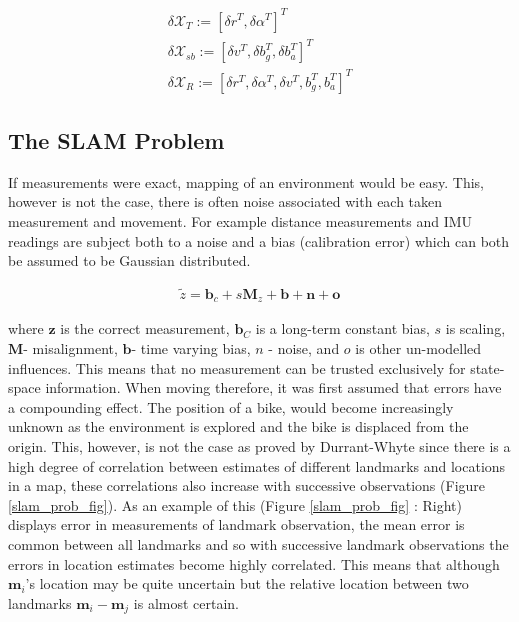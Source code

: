 \documentclass[a4paper,11pt,notitlepage]{article}
\begin{document}
\begin{equation}
\begin{aligned}
\label{states_2}
\delta \mathcal{X}_{T} := [ \delta r^{T}, \delta \alpha^{T} ]^{T} \\
\delta \mathcal{X}_{sb} := [ \delta v^{T}, \delta b_{g}^{T},\delta b_{a}^{T} ]^{T} \\
\delta \mathcal{X}_{R} := [ \delta r^{T}, \delta \alpha^{T}, \delta v^{T},b_{g}^{T}, b_{a}^{T}]^{T}
\end{aligned}
\end{equation}


\subsection{The SLAM Problem}

If measurements were exact, mapping of an environment would be easy. This, however is not the case, there is often noise associated with each taken measurement and movement. For example distance measurements and IMU readings are subject both to a noise and a bias (calibration error) which can both be assumed to be Gaussian distributed.

\begin{equation}
\begin{aligned}
\tilde{z} = \textbf{b}_{c} + s\textbf{M}_{z} + \textbf{b} + \textbf{n} + \textbf{o}
\end{aligned}
\end{equation}

where $\textbf{z}$ is the correct measurement, $\textbf{b}_{C}$ is a long-term constant bias, $s$ is scaling, $\textbf{M}$- misalignment, $\textbf{b}$- time varying bias, $n$ - noise, and $o$ is other un-modelled influences. This means that no measurement can be trusted exclusively for state-space information. When moving therefore, it was first assumed that errors have a compounding effect. The position of a bike, would become increasingly unknown as the environment is explored and the bike is displaced from the origin. This, however, is not the case as proved by Durrant-Whyte \cite{F_Durr_1} since there is a high degree of correlation between estimates of different landmarks and locations in a map, these correlations also increase with successive observations (Figure \ref{slam_prob_fig}). As an example of this (Figure \ref{slam_prob_fig} : Right) displays error in measurements of landmark observation, the mean error is common between all landmarks and so with successive landmark observations the errors in location estimates become highly correlated. This means that although $\textbf{m}_{i}$'s location may be quite uncertain but the relative location between two landmarks $\textbf{m}_{i}-\textbf{m}_{j}$ is almost certain.
\end{document}

